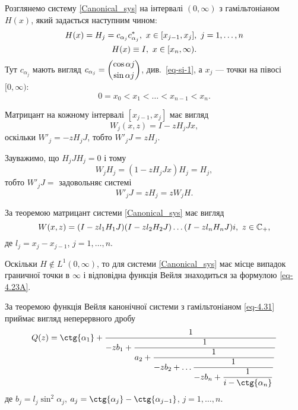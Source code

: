 \begin{example}
	Розглянемо систему \eqref{Canonical_sys} на інтервалі $(0,\infty)$ з гамільтоніаном $H(x)$, який задається наступним чином:
	 \begin{gather}\label{eq-4.31}
	 	H(x) = H_j = c_{\alpha_j}c^*_{\alpha_j}, \ x\in [x_{j-1},x_j], \ j=1,\ldots,n\\
	 	H(x) \equiv I, \ x\in[x_n,\infty). \notag
	 \end{gather}
	Тут $c_{\alpha_j}$ мають вигляд $c_{\alpha_j} = \dbinom{\cos{\alpha j}}{\sin{\alpha j}}$, див.~\eqref{eq-si-1}, а $x_j$ --- точки на півосі $[0,\infty)$:
	\begin{equation*}
		0=x_0<x_1<\ldots<x_{n-1}<x_n.
	\end{equation*}

	Матрицант на кожному інтервалі $[x_{j-1},x_j]$ має вигляд
	\begin{equation}\label{eq-4.32}
		W_j(x,z) = I - zH_jJx,
	\end{equation}
	оскільки $W'_j = -zH_jJ$, тобто $W'_j J = zH_j$.

	Зауважимо, що $H_jJH_j =0$ і тому
	\begin{equation*}
		W_jH_j = (1-zH_jJx)H_j = H_j,
	\end{equation*}
	тобто $W'_j J = $ задовольняє системі
	\begin{equation*}
		W'_j J = zH_j = zW_jH.
	\end{equation*}
	
	За теоремою
	матрицант системи \eqref{Canonical_sys} має вигляд
	\begin{equation}\label{eq-4.33}
		W(x,z) = (I-zl_1H_1J)(I-zl_2H_2J)\ldots(I-zl_nH_nJ)i, \ z\in\bbC_+,
	\end{equation}
	де $l_j=x_j-x_{j-1}$, $j=1,\ldots,n$.

	Оскільки $H\notin L^1(0,\infty)$, то для системи \eqref{Canonical_sys} має місце випадок граничної точки в $\infty$ і відповідна функція Вейля знаходиться за формулою \eqref{eq-4.23A}.

	За теоремою
	функція Вейля канонічної системи з гамільтоніаном \eqref{eq-4.31} приймає вигляд неперервного дробу
	\begin{equation}
		Q(z) = \ctg{\alpha_1} + \dfrac{1}
									{-zb_1 + \dfrac{1}
												{a_2 + \dfrac{1}
															{-zb_2 + \ldots \dfrac{1}
																				{-zb_n + \dfrac{1}
																							{i-\ctg{\alpha_n}}}}}}
	\end{equation}
	де $b_j = l_j\sin^2{\alpha_j}$, $a_j = \ctg{\alpha_j} - \ctg{\alpha_{j-1}}$, $j=1,\ldots,n$.
\end{example}
